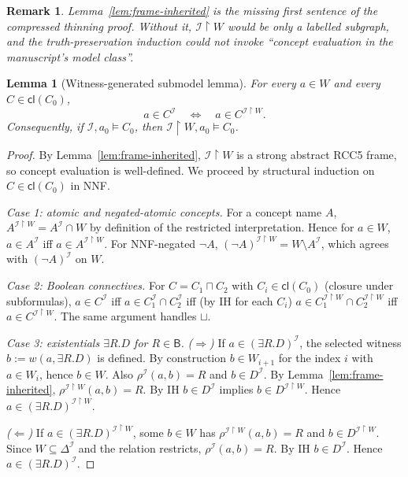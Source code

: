 \documentclass[11pt]{article}
\newtheorem{lemma}[theorem]{Lemma}
\newtheorem{remark}[theorem]{Remark}
\newcommand{\Base}{\mathsf{B}}
\newcommand{\Cl}{\mathsf{cl}}
\newcommand{\I}{\mathcal I}
\begin{document}
\begin{remark}
Lemma~\ref{lem:frame-inherited} is the missing first sentence of the
compressed thinning proof.  Without it, $\I\!\upharpoonright\!W$
would be only a labelled subgraph, and the truth-preservation
induction could not invoke ``concept evaluation in the manuscript's
model class''.
\end{remark}

\begin{lemma}[Witness-generated submodel lemma]\label{lem:thinning}
For every $a\in W$ and every $C\in\Cl(C_0)$,
\[
  a\in C^\I \quad\Longleftrightarrow\quad a\in C^{\I\upharpoonright W}.
\]
Consequently, if $\I,a_0\models C_0$, then $\I\!\upharpoonright\!W,a_0\models C_0$.
\end{lemma}

\begin{proof}
By Lemma~\ref{lem:frame-inherited}, $\I\!\upharpoonright\!W$ is a
strong abstract RCC5 frame, so concept evaluation is well-defined.
We proceed by structural induction on $C\in\Cl(C_0)$ in NNF.

\emph{Case 1: atomic and negated-atomic concepts.}  For a concept
name $A$, $A^{\I\upharpoonright W}=A^\I\cap W$ by definition of the
restricted interpretation.  Hence for $a\in W$, $a\in A^\I$ iff
$a\in A^{\I\upharpoonright W}$.  For NNF-negated $\neg A$,
$(\neg A)^{\I\upharpoonright W}=W\setminus A^\I$, which agrees with
$(\neg A)^\I$ on $W$.

\emph{Case 2: Boolean connectives.}  For $C=C_1\sqcap C_2$ with
$C_i\in\Cl(C_0)$ (closure under subformulas), $a\in C^\I$ iff
$a\in C_1^\I\cap C_2^\I$ iff (by IH for each $C_i$)
$a\in C_1^{\I\upharpoonright W}\cap C_2^{\I\upharpoonright W}$ iff
$a\in C^{\I\upharpoonright W}$.  The same argument handles
$\sqcup$.

\emph{Case 3: existentials $\exists R.D$ for $R\in\Base$.}
\emph{($\Rightarrow$)} If $a\in(\exists R.D)^\I$, the selected
witness $b:=w(a,\exists R.D)$ is defined.  By construction
$b\in W_{i+1}$ for the index $i$ with $a\in W_i$, hence $b\in W$.
Also $\rho^\I(a,b)=R$ and $b\in D^\I$.  By
Lemma~\ref{lem:frame-inherited},
$\rho^{\I\upharpoonright W}(a,b)=R$.  By IH $b\in D^\I$ implies
$b\in D^{\I\upharpoonright W}$.  Hence
$a\in(\exists R.D)^{\I\upharpoonright W}$.

\emph{($\Leftarrow$)} If $a\in(\exists R.D)^{\I\upharpoonright W}$,
some $b\in W$ has $\rho^{\I\upharpoonright W}(a,b)=R$ and
$b\in D^{\I\upharpoonright W}$.  Since $W\subseteq\Delta^\I$ and the
relation restricts, $\rho^\I(a,b)=R$.  By IH $b\in D^\I$.  Hence
$a\in(\exists R.D)^\I$.


\end{proof}
\end{document}
